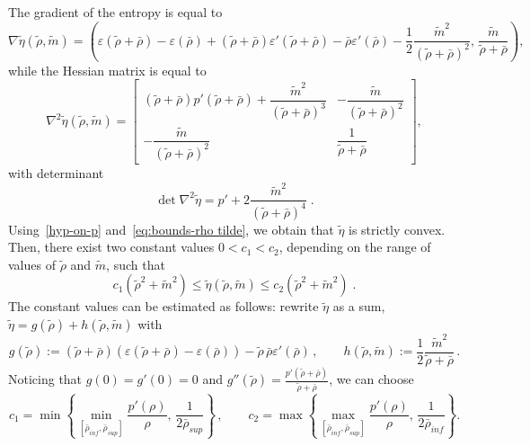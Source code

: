 \documentclass[10pt,reqno]{amsart}
\newcommand{\eps}{\varepsilon}
\begin{document}
The gradient of the entropy is equal to
\begin{equation*}
    \nabla\tilde\eta(\tilde\rho,\tilde m)=\left(\eps(\tilde\rho+\bar\rho)-\eps(\bar\rho)+(\tilde\rho+\bar\rho)\eps'(\tilde\rho+\bar\rho)-\bar\rho\eps'(\bar\rho)-\frac{1}{2}\frac{\tilde m^2}{(\tilde\rho+\bar\rho)^2},\,\frac{\tilde m}{\tilde\rho+\bar\rho}\right),
\end{equation*}
while the Hessian matrix is equal to
\begin{equation*}
    \nabla^2{\tilde\eta}(\tilde\rho,\tilde m) = 
    \begin{bmatrix}
        (\tilde\rho+\bar\rho)p'(\tilde\rho+\bar\rho) + \dfrac{\tilde m^2}{(\tilde\rho+\bar\rho)^3} & -\dfrac{\tilde m}{(\tilde\rho+\bar\rho)^2}\\
        -\dfrac{\tilde m}{(\tilde\rho+\bar\rho)^2} & \dfrac{1}{\tilde\rho+\bar\rho}
    \end{bmatrix},
\end{equation*}
with determinant
$$\det\nabla^2{\tilde\eta}= p'+2\frac{\tilde m^2}{(\tilde\rho+\bar\rho)^4}\;.
$$ 
Using~\eqref{hyp-on-p} and~\eqref{eq:bounds-rho tilde}, we obtain that $\tilde\eta$ is strictly convex. Then, there exist two constant values $0<c_1<c_2$, depending on the range of values of $\tilde \rho$ and $\tilde m$, such that
\begin{equation}\label{eq:bounds-entropy}
    c_1(\tilde\rho^2+\tilde m^2)\leq \tilde\eta(\tilde\rho,\tilde m)\leq c_2(\tilde\rho^2+\tilde m^2)\;.
\end{equation}
The constant values can be estimated as follows: rewrite $\tilde\eta$ as 
 a sum, $\tilde\eta =  g(\tilde\rho)+h(\tilde\rho,\tilde m)$  with %
 \begin{equation*}
    g(\tilde\rho):=(\tilde\rho+\bar\rho)(\eps(\tilde\rho+\bar\rho)-\eps(\bar\rho))-\tilde\rho\,\bar\rho\eps'(\bar\rho)\,,\qquad h(\tilde\rho,\tilde m):=\frac{1}{2}\frac{\tilde m^2}{\tilde\rho+\bar\rho}\,.
 \end{equation*}
Noticing that $g(0)=g'(0)=0$ and $g''(\tilde\rho)= \frac{p'(\tilde\rho+\bar\rho)}{\tilde\rho+\bar\rho}$, we can choose
\begin{equation}\label{def:c1c2}
c_1 = \min\left\{\min_{[\bar\rho_{inf},\bar\rho_{sup}]}\frac{p'(\rho)}{\rho},\,\frac{1}{2 \bar\rho_{sup} }\right\}
\,,\qquad
c_2 = \max\left\{\max_{[\bar\rho_{inf},\bar\rho_{sup}]}\frac{p'(\rho)}{\rho},\,\frac{1}{2 \bar\rho_{inf} }\right\}.
\end{equation} 
\end{document}
